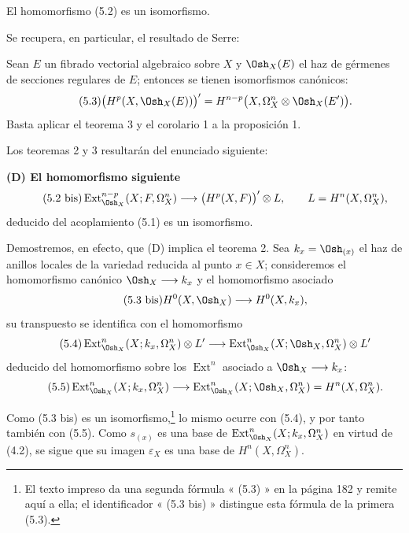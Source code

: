  El homomorfismo (5.2) es un isomorfismo.

Se recupera, en particular, el resultado de Serre:

 Sean $E$ un fibrado vectorial algebraico sobre $X$ y
$\Osh_X(E)$ el haz de gérmenes de secciones regulares de $E$; entonces se tienen
isomorfismos canónicos:
\begin{equation}\tag{5.3}
  \bigl(H^{p}(X,\Osh_X(E))\bigr)'
  =H^{n-p}\bigl(X,\Omega_X^{n}\otimes\Osh_X(E')\bigr).
\end{equation}
Basta aplicar el teorema 3 y el corolario 1 a la proposición 1.

Los teoremas 2 y 3 resultarán del enunciado siguiente:

\noindent\textbf{(D) El homomorfismo siguiente}
\begin{equation}\tag{5.2 bis}
  \operatorname{Ext}_{\Osh_X}^{n-p}(X;F,\Omega_X^{n})
  \longrightarrow\bigl(H^{p}(X,F)\bigr)'\otimes L,
  \qquad L=H^{n}(X,\Omega_X^{n}),
\end{equation}
deducido del acoplamiento (5.1) es un isomorfismo.

Demostremos, en efecto, que (D) implica el teorema 2. Sea
$k_x=\Osh_{(x)}$ el haz de anillos locales de la variedad reducida al punto
$x\in X$; consideremos el homomorfismo canónico
$\Osh_X\longrightarrow k_x$ y el homomorfismo asociado
\begin{equation}\tag{5.3 bis}
  H^{0}(X,\Osh_X)\longrightarrow H^{0}(X,k_x),
\end{equation}
su transpuesto se identifica con el homomorfismo
\begin{equation}\tag{5.4}
  \operatorname{Ext}_{\Osh_X}^{n}(X;k_x,\Omega_X^{n})\otimes L'
  \longrightarrow
  \operatorname{Ext}_{\Osh_X}^{n}(X;\Osh_X,\Omega_X^{n})\otimes L'
\end{equation}
deducido del homomorfismo sobre los $\operatorname{Ext}^{n}$ asociado a
$\Osh_X\longrightarrow k_x$:
\begin{equation}\tag{5.5}
  \operatorname{Ext}_{\Osh_X}^{n}(X;k_x,\Omega_X^{n})
  \longrightarrow
  \operatorname{Ext}_{\Osh_X}^{n}(X;\Osh_X,\Omega_X^{n})
  =H^{n}(X,\Omega_X^{n}).
\end{equation}

Como (5.3 bis) es un isomorfismo,\footnote{El texto impreso da una
segunda fórmula « (5.3) » en la página 182 y remite aquí a ella; el identificador
« (5.3 bis) » distingue esta fórmula de la primera (5.3).} lo mismo ocurre
con (5.4), y por tanto también con (5.5). Como $s_{(x)}$ es una base de
$\operatorname{Ext}_{\Osh_X}^{n}(X;k_x,\Omega_X^{n})$ en virtud de (4.2), se
sigue que su imagen $\varepsilon_X$ es una base de
$H^{n}(X,\Omega_X^{n})$.


